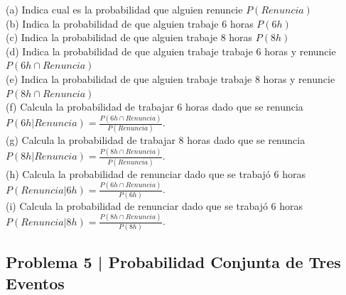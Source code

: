 \documentclass{article}
\begin{document}
\break
\noindent
(a) Indica cual es la probabilidad que alguien renuncie $P(Renuncia)$
\\[6pt]
(b) Indica la probabilidad de que alguien trabaje 6 horas $P(6h)$
\\[6pt]
(c) Indica la probabilidad de que alguien trabaje 8 horas $P(8h)$
\\[6pt]
(d) Indica la probabilidad de que alguien trabaje trabaje 6 horas y renuncie $P(6h \cap Renuncia)$
\\[6pt]
(e) Indica la probabilidad de que alguien trabaje trabaje 8 horas y renuncie $P(8h \cap Renuncia)$
\\[6pt]
(f) Calcula la probabilidad de trabajar 6 horas dado que se renuncia 
\\[6pt]
$P(6h|Renuncia) = \frac{P(6h \cap Renuncia)}{P(Renuncia)}$.
\\[6pt]
(g) Calcula la probabilidad de trabajar 8 horas dado que se renuncia
\\[6pt]
$P(8h|Renuncia) = \frac{P(8h \cap Renuncia)}{P(Renuncia)}$.
\\[6pt]
(h) Calcula la probabilidad de renunciar dado que se trabajó 6 horas 
\\[6pt]
$P(Renuncia|6h) = \frac{P(6h \cap Renuncia)}{P(6h)}$.
\\[6pt]
(i) Calcula la probabilidad de renunciar dado que se trabajó 6 horas 
\\[6pt]
$P(Renuncia|8h) = \frac{P(8h \cap Renuncia)}{P(8h)}$.

\clearpage

\subsection*{Problema 5 | Probabilidad Conjunta de Tres Eventos}
\end{document}
